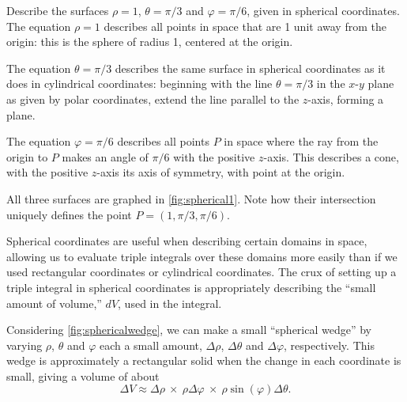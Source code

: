 \begin{example}\label{ex_spherical1}
Describe the surfaces $\rho=1$, $\theta = \pi/3$ and $\varphi = \pi/6$, given in spherical coordinates.
%
%
\solution
The equation $\rho = 1$ describes all points in space that are 1 unit away from the origin: this is the sphere of radius 1, centered at the origin.

The equation $\theta = \pi/3$ describes the same surface in spherical coordinates as it does in cylindrical coordinates: beginning with the line $\theta = \pi/3$ in the $x$-$y$ plane as given by polar coordinates, extend the line parallel to the $z$-axis, forming a plane.

The equation $\varphi=\pi/6$ describes all points $P$ in space where the ray from the origin to $P$ makes an angle of $\pi/6$ with the positive $z$-axis. This describes a cone, with the positive $z$-axis its axis of symmetry, with point at the origin.

All three surfaces are graphed in \autoref{fig:spherical1}. Note how their intersection uniquely defines the point $P=(1,\pi/3,\pi/6)$.
\end{example}

Spherical coordinates are useful when describing certain domains in space, allowing us to evaluate triple integrals over these domains more easily than if we used rectangular coordinates or cylindrical coordinates. The crux of setting up a triple integral in spherical coordinates is appropriately describing the ``small amount of volume,'' $dV$, used in the integral.


Considering \autoref{fig:sphericalwedge}, we can make a small ``spherical wedge'' by varying $\rho$, $\theta$ and $\varphi$ each a small amount, $\Delta\rho$, $\Delta\theta$ and $\Delta\varphi$, respectively. This wedge is approximately a rectangular solid when the change in each coordinate is small, giving a volume of about
\[
\Delta V \approx \Delta\rho\ \times\ \rho\Delta\varphi\ \times\ \rho\sin(\varphi)\Delta\theta.
\]

